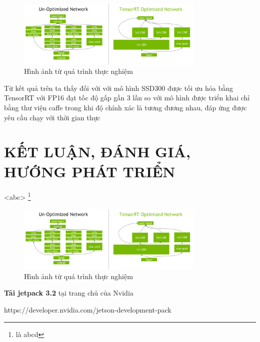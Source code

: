 \documentclass[a4paper]{report}
\begin{document}
	\begin{figure}[h!]
		\centering
		\includegraphics[width=0.8\textwidth]{4_2_combine.png}
		\caption{Hình ảnh từ quá trình thực nghiệm}
	\end{figure}
	Từ kết quả trên ta thấy đối với với mô hình SSD300 được tối ưu hóa bằng TensorRT với FP16 đạt tốc độ gấp gần 3 lần so với mô hình được triển khai chỉ bằng thư viện caffe trong khi độ chính xác là tương đương nhau, đáp ứng được yêu cầu chạy với thời gian thực\\



\chapter{KẾT LUẬN, ĐÁNH GIÁ, HƯỚNG PHÁT TRIỂN}


<abc>
\footnote{là abcd}

	

\begin{figure}[h!]
	\centering
	\includegraphics[width=0.8\textwidth]{4_2_combine.png}
	\caption{Hình ảnh từ quá trình thực nghiệm}
\end{figure}

\textbf{Tải jetpack 3.2} tại trang chủ của Nvidia
\begin{center}
\color{blue}
https://developer.nvidia.com/jetson-development-pack
\end{center}
\end{document}
